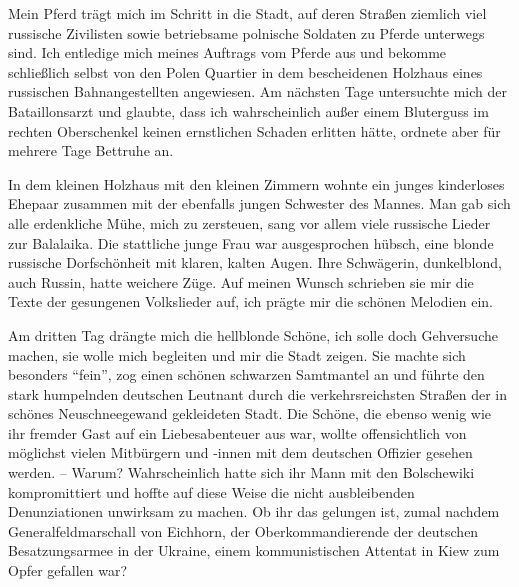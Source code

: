 \documentclass[a5paper,pagesize,10pt,twoside=true]{scrbook}
\begin{document}
Mein Pferd trägt mich im Schritt in die Stadt, auf deren Straßen ziemlich viel russische Zivilisten sowie betriebsame polnische Soldaten zu Pferde unterwegs sind. Ich entledige mich meines Auftrags vom Pferde aus und bekomme schließlich selbst von den Polen Quartier in dem bescheidenen Holzhaus eines russischen Bahnangestellten angewiesen. Am nächsten Tage untersuchte mich der Bataillonsarzt und glaubte, dass ich wahrscheinlich außer einem Bluterguss im rechten Oberschenkel keinen ernstlichen Schaden erlitten hätte, ordnete aber für mehrere Tage Bettruhe an.

In dem kleinen Holzhaus mit den kleinen Zimmern wohnte ein junges kinderloses Ehepaar zusammen mit der ebenfalls jungen Schwester des Mannes. Man gab sich alle erdenkliche Mühe, mich zu zersteuen, sang vor allem viele russische Lieder zur Balalaika. Die stattliche junge Frau war ausgesprochen hübsch, eine blonde russische Dorfschönheit mit klaren, kalten Augen. Ihre Schwägerin, dunkelblond, auch Russin, hatte weichere Züge. Auf meinen Wunsch schrieben sie mir die Texte der gesungenen Volkslieder auf, ich prägte mir die schönen Melodien ein.

Am dritten Tag drängte mich die hellblonde Schöne, ich solle doch Gehversuche machen, sie wolle mich begleiten und mir die Stadt zeigen. Sie machte sich besonders \enquote{fein}, zog einen schönen schwarzen Samtmantel an und führte den stark humpelnden deutschen Leutnant durch die verkehrsreichsten Straßen der in schönes Neuschneegewand gekleideten Stadt. Die Schöne, die ebenso wenig wie ihr fremder Gast auf ein Liebesabenteuer aus war, wollte offensichtlich von möglichst vielen Mitbürgern und -innen mit dem deutschen Offizier gesehen werden. -- Warum? Wahrscheinlich hatte sich ihr Mann mit den Bolschewiki kompromittiert und hoffte auf diese Weise die nicht ausbleibenden Denunziationen unwirksam zu machen. Ob ihr das gelungen ist, zumal nachdem Generalfeldmarschall von Eichhorn, der Oberkommandierende der deutschen Besatzungsarmee in der Ukraine, einem kommunistischen Attentat in Kiew zum Opfer gefallen war?
\end{document}
